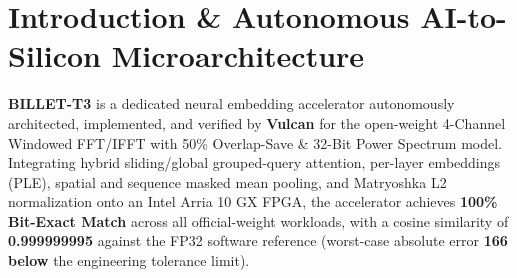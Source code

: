 \documentclass[11pt,a4paper]{article}
\begin{document}
\section{Introduction \& Autonomous AI-to-Silicon Microarchitecture}

\textbf{BILLET-T3} is a dedicated neural embedding accelerator autonomously architected, implemented, and verified by \textbf{Vulcan} for the open-weight 4-Channel Windowed FFT/\allowbreak{}IFFT with 50\% Overlap-Save \& 32-Bit Power Spectrum model. Integrating hybrid sliding/global grouped-query attention, per-layer embeddings (PLE), spatial and sequence masked mean pooling, and Matryoshka L2 normalization onto an Intel Arria 10 GX FPGA, the accelerator achieves \textbf{100\% Bit-Exact Match} across all official-weight workloads, with a cosine similarity of \textbf{0.999999995} against the FP32 software reference (worst-case absolute error \textbf{166\texttimes{} below} the engineering tolerance limit).

\vspace{2pt}
\end{document}
